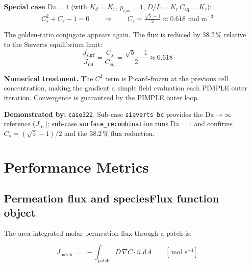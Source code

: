 \documentclass[11pt,a4paper]{article}
\newcommand{\mol}{\,\text{mol}}
\newcommand{\m}{\,\text{m}}
\newcommand{\s}{\,\text{s}}
\newcommand{\caseref}[1]{\texttt{\color{casegreen}#1}}
\newcommand{\Da}{\mathrm{Da}}
\begin{document}
\textbf{Special case $\Da = 1$} (with $K_d = K_r$, $p_\text{gas} = 1$,
$D/L = K_r\,C_\text{eq} = K_r$):
\begin{equation}\label{eq:Cs_Da1}
  C_s^2 + C_s - 1 = 0
  \qquad\Rightarrow\qquad
  C_s = \tfrac{\sqrt{5}-1}{2} \approx 0.618\,\mol\,\m^{-3}
\end{equation}

The golden-ratio conjugate appears again.  The flux is reduced by 38.2\,\%
relative to the Sieverts equilibrium limit:
\begin{equation}\label{eq:flux_Da1}
  \frac{J_\text{surf}}{J_\text{ref}} = \frac{C_s}{C_\text{eq}} = \frac{\sqrt{5}-1}{2}
  \approx 0.618
\end{equation}

\textbf{Numerical treatment.}
The $C^2$ term is Picard-frozen at the previous cell concentration,
making the gradient a simple field evaluation each PIMPLE outer iteration.
Convergence is guaranteed by the PIMPLE outer loop.

\begin{tcolorbox}[casebox]
  \textbf{Demonstrated by:} \caseref{case322}.
  Sub-case \texttt{sieverts\_bc} provides the $\Da \to \infty$ reference
  ($J_\text{ref}$); sub-case \texttt{surface\_recombination} runs $\Da = 1$
  and confirms $C_s = (\sqrt5-1)/2$ and the 38.2\,\% flux reduction.
\end{tcolorbox}

\section{Performance Metrics}
\label{sec:metrics}

\subsection{Permeation flux and speciesFlux function object}
\label{sec:flux_fo}

The area-integrated molar permeation flux through a patch is:

\begin{tcolorbox}[eqbox,title={Surface molar flux}]
\begin{equation}\label{eq:J}
  J_\text{patch}
  \;=\;
  -\!\int_\text{patch} D\,\nabla C \cdot \hat{n}\;\mathrm{d}A
  \qquad [\mol\,\s^{-1}]
\end{equation}
\end{tcolorbox}
\end{document}
